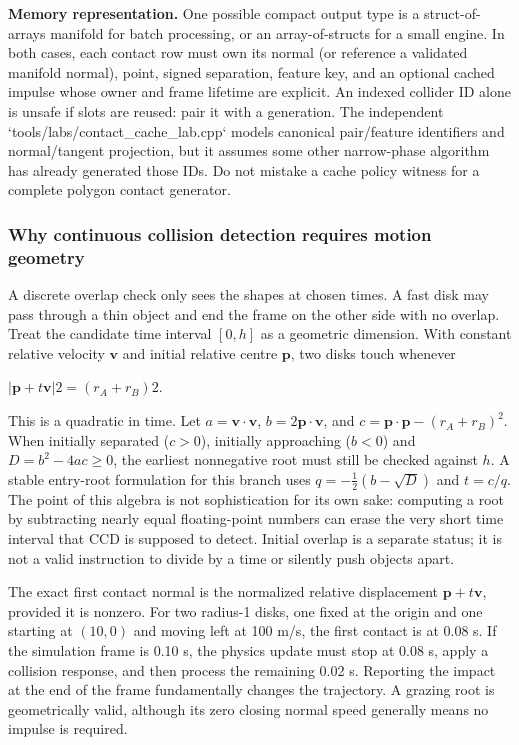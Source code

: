\textbf{Memory representation.} One possible compact output type is a struct-of-arrays manifold for batch processing, or an array-of-structs for a small engine. In both cases, each contact row must own its normal (or reference a validated manifold normal), point, signed separation, feature key, and an optional cached impulse whose owner and frame lifetime are explicit. An indexed collider ID alone is unsafe if slots are reused: pair it with a generation. The independent `tools/labs/contact\_cache\_lab.cpp` models canonical pair/feature identifiers and normal/tangent projection, but it assumes some other narrow-phase algorithm has already generated those IDs. Do not mistake a cache policy witness for a complete polygon contact generator.

\subsubsection{Why continuous collision detection requires motion geometry}\label{04-visual-computing-ii-ch026-why-continuous-collision-detection-requires-motion-geometry}

A discrete overlap check only sees the shapes at chosen times. A fast disk may pass through a thin object and end the frame on the other side with no overlap. Treat the candidate time interval \([0,h]\) as a geometric dimension. With constant relative velocity \(\mathbf v\) and initial relative centre \(\mathbf p\), two disks touch whenever

\(|\mathbf p+t\mathbf v|2=(r_A+r_B)2.\)

This is a quadratic in time. Let \(a=\mathbf v\cdot\mathbf v\), \(b=2\mathbf p\cdot\mathbf v\), and \(c=\mathbf p\cdot\mathbf p-(r_A+r_B)^2\). When initially separated (\(c>0\)), initially approaching (\(b<0\)) and \(D=b^2-4ac\ge0\), the earliest nonnegative root must still be checked against \(h\). A stable entry-root formulation for this branch uses \(q=-\frac12(b-\sqrt D)\) and \(t=c/q\). The point of this algebra is not sophistication for its own sake: computing a root by subtracting nearly equal floating-point numbers can erase the very short time interval that CCD is supposed to detect. Initial overlap is a separate status; it is not a valid instruction to divide by a time or silently push objects apart.

The exact first contact normal is the normalized relative displacement \(\mathbf p+t\mathbf v\), provided it is nonzero. For two radius-1 disks, one fixed at the origin and one starting at \((10,0)\) and moving left at 100 m/s, the first contact is at 0.08 s. If the simulation frame is 0.10 s, the physics update must stop at 0.08 s, apply a collision response, and then process the remaining 0.02 s. Reporting the impact at the end of the frame fundamentally changes the trajectory. A grazing root is geometrically valid, although its zero closing normal speed generally means no impulse is required.

